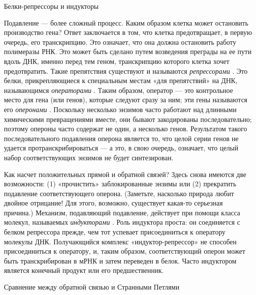 Белки-репрессоры и индукторы

Подавление --- более сложный процесс. Каким образом клетка может остановить производство гена? Ответ заключается в том, что клетка предотвращает, в первую очередь, его транскрипцию. Это означает, что она должна остановить работу полимеразы РНК. Это может быть сделано путем возведения преграды на ее пути вдоль ДНК, именно перед тем геном, транскрипцию которого клетка хочет предотвратить. Такие препятствия существуют и называются \emph{репрессорами} . Это белки, прикрепляющиеся к специальным местам «для препятствий» на ДНК, называющимся \emph{операторами} . Таким образом, оператор --- это контрольное место для гена (или генов), которые следуют сразу за ним; эти гены называются его \emph{оперонами} . Поскольку несколько энзимов часто работают над длинными химическими превращениями вместе, они бывают закодированы последовательно; поэтому опероны часто содержат не один, а несколько генов. Результатом такого последовательного подавления оперона является то, что целой серии генов не удается протранскрибироваться --- а это, в свою очередь, означает, что целый набор соответствующих энзимов не будет синтезирован.

Как насчет положительных прямой и обратной связей? Здесь снова имеются две возможности: (1) «прочистить» заблокированные энзимы или (2) прекратить подавление соответствующего оперона. (Заметьте, насколько природа любит двойное отрицание! Для этого, возможно, существует какая-то серьезная причина.) Механизм, подавляющий подавление, действует при помощи класса молекул, называемых \emph{индукторами} . Роль индуктора проста: он соединяется с белком репрессора прежде, чем тот успевает присоединиться к оператору молекулы ДНК. Получающийся комплекс «индуктор-репрессор» не способен присоединиться к оператору, и, таким образом, соответствующий оперон может быть транскрибирован в мРНК и затем переведен в белок. Часто индуктором является конечный продукт или его предшественник.

Сравнение между обратной связью и Странными Петлями

